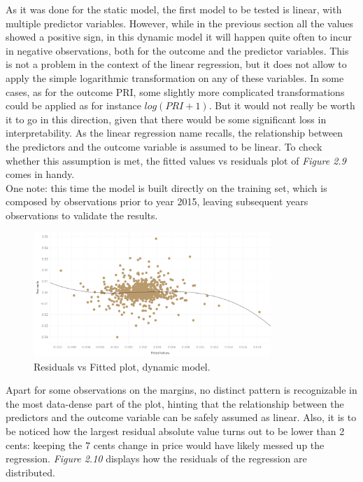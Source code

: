 \documentclass{book}
\begin{document}
As it was done for the static model, the first model to be tested is linear, with multiple predictor variables. However, while in the previous section all the values showed a positive sign, in this dynamic model it will happen quite often to incur in negative observations, both for the outcome and the predictor variables. This is not a problem in the context of the linear regression, but it does not allow to apply the  simple logarithmic transformation on any of these variables. In some cases, as for the outcome PRI, some slightly more complicated transformations could be applied as for instance $log(PRI+1)$. But it would not really be worth it to go in this direction, given that there would be some significant loss in interpretability. As the linear regression name recalls, the relationship between the predictors and the outcome variable is assumed to be linear. To check whether this assumption is met, the fitted values vs residuals plot of \textit{Figure 2.9} comes in handy.\\

One note: this time the model is built directly on the training set, which is composed by observations prior to year 2015, leaving subsequent years observations to validate the results.

\bigskip
\begin{figure}[H]
\begin{center}
\captionsetup{justification=centering}
\includegraphics[width=0.8\textwidth]{Images/dynres.png}
\caption{Residuals vs Fitted plot, dynamic model.}
\end{center}
\end{figure}
\bigskip

Apart for some observations on the margins, no distinct pattern is recognizable in the most data-dense part of the plot, hinting that the relationship between the predictors and the outcome variable can be safely assumed as linear. Also, it is to be noticed how the largest residual absolute value turns out to be lower than 2 cents: keeping the 7 cents change in price would have likely messed up the regression. \textit{Figure 2.10} displays how the residuals of the regression are distributed.
\end{document}
